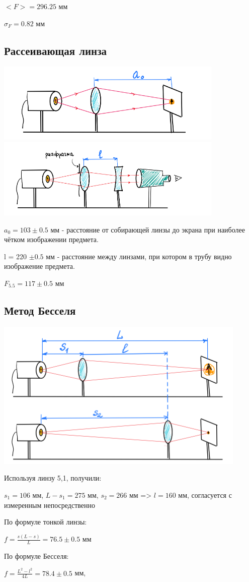 \documentclass{article}
\begin{document}
$<F> = 296.25$ мм

$\sigma_F = 0.82$ мм

\subsection{Рассеивающая линза}
\includegraphics[width=0.5\linewidth]{изображение.png}
\includegraphics[width=0.5\linewidth]{схема_рассеив.png}

$a_0 = 103 \pm 0.5$ мм - расстояние от собирающей линзы до экрана при наиболее чётком изображении предмета.

l = 220 $\pm 0.5$ мм - расстояние между линзами, при котором в трубу видно изображение предмета.

$F_{5.5} = 117 \pm 0.5$ мм

\subsection{Метод Бесселя}

\includegraphics[width=0.5\linewidth]{Снимок экрана от 2024-05-09 18-56-35.png}

Используя линзу 5,1, получили:

$s_1 = 106 $ мм, $L - s_1 = 275$ мм, $s_2 = 266 $ мм => $l = 160$ мм, согласуется с измеренным непосредственно

По формуле тонкой линзы:

$f = \frac{s(L-s)}{L} = 76.5 \pm 0.5$ мм

По формуле Бесселя:

$f = \frac{L^2 - l^2}{4L} = 78.4 \pm 0.5$ мм,
\end{document}

